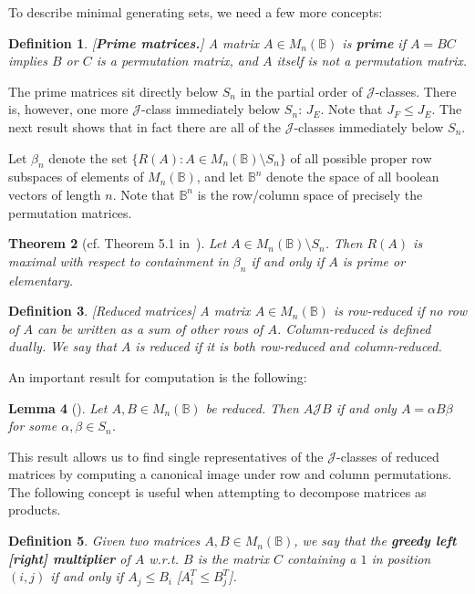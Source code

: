 \documentclass[11pt]{article}
\newtheorem{thm}{Theorem}[section]
\newtheorem{lemma}[thm]{Lemma}
\newtheorem{defi}[thm]{Definition}
\newenvironment{de}{\begin{defi}\rm}{\end{defi}}
\newcommand{\defn}[1]{\textbf{\textit{#1}}}
\numberwithin{equation}{section}
\newcommand{\set}[2]{\ensuremath{\{#1 : #2 \}}}
\newcommand{\B}{\mathbb{B}}
\newcommand{\Bn}{M_n(\B)}
\newcommand{\J}{\mathscr{J}}
\begin{document}
To describe minimal generating sets, we need a few more concepts:

\begin{de}[\textbf{Prime matrices.}]
  A matrix $A \in \Bn$ is \defn{prime} if $A = BC$ implies $B$ or $C$ is a
  permutation matrix, and $A$ itself is not a permutation matrix.
\end{de}

The prime matrices sit directly below $S_n$ in the partial order of
$\J$-classes. There is, however, one more $\J$-class immediately below $S_n$:
$J_E$. Note that $J_F \leq J_E$. The next result shows that in fact there are
all of the $\J$-classes immediately below $S_n$.

Let $\beta_n$ denote the set $\set{R(A)}{A\in \Bn\setminus S_n}$ of all
possible proper row subspaces of elements of $\Bn$, and let $\B^n$ denote
the space of all boolean vectors of length $n$. Note that $\B^n$ is the
row/column space of precisely the permutation matrices.

\begin{thm}[cf. Theorem 5.1 in~\cite{Caen1981ab}]
  Let $A \in \Bn\setminus S_n$. Then $R(A)$ is maximal with respect to
  containment in $\beta_n$ if and only if $A$ is prime or elementary.  
\end{thm}

\begin{de}[Reduced matrices]
  A matrix $A \in \Bn$ is \emph{row-reduced} if no row of $A$ can be written as
  a sum of other rows of $A$. \emph{Column-reduced} is defined dually. We say
  that $A$ is \emph{reduced} if it is both row-reduced and column-reduced.
\end{de}

An important result for computation is the following:
\begin{lemma}[\cite{Plemmons1970aa}]
  Let $A, B \in \Bn$ be reduced. Then $A \J B$ if and only $A = \alpha B \beta$
  for some $\alpha, \beta \in S_n$. 
\end{lemma}

This result allows us to find single representatives of the $\J$-classes of
reduced matrices by computing a canonical image under row and column
permutations. \\

The following concept is useful when attempting to decompose matrices as
products.
\begin{defi}
  Given two matrices $A, B \in \Bn$, we say that the \textbf{\textit{greedy
  left [right] multiplier}} of $A$ w.r.t. $B$ is the matrix $C$ containing a $1$
  in position $(i, j)$ if and only if $A_j \leq B_i$ [$A^T_i \leq B^T_j$].
\end{defi}
\end{document}
